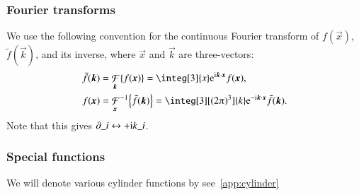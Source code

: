 \subsubsection{Fourier transforms} %
We use the following convention for the continuous Fourier transform of $f(\vec{x})$, $\tilde{f}(\vec{k})$, and its inverse, where $\vec{x}$ and $\vec{k}$ are three-vectors:
\begin{equation}\label{eq:notation:Fourier_transform_and_inverse}
    \begin{split}
        \tilde{f}(\vec{k}) &={\mathop{\mathcal{F}}_{\vec{k}}} {\cclosed{f(\vec{x})}}  =\integ[3]{x}\eu[\im \vec{k}\cdot \vec{x}]f(\vec{x}), \\
        f(\vec{x}) &=  {\mathop{\mathcal{F}}_{\vec{x}}}^{-1}  {\cclosed{\tilde{f}(\vec{k})}}  =\integ[3][(2\ppi)^3]{k} \eu[-\im \vec{k}\cdot \vec{x}]\tilde{f}(\vec{k}).
    \end{split}
\end{equation}
Note that this gives $\partial\_i \leftrightarrow +\mathrm{i} k\_i$.





\subsubsection{Special functions} %
We will denote various cylinder functions by \blahblah see~\cref{app:cylinder}

